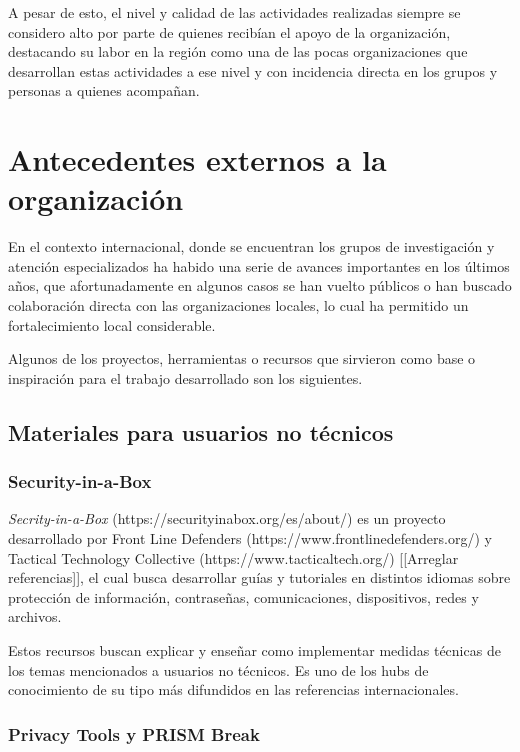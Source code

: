\documentclass[12pt]{caltech_thesis}
\begin{document}
A pesar de esto, el nivel y calidad de las actividades realizadas siempre se considero alto por parte de quienes recibían el apoyo de la organización, destacando su labor en la región como una de las pocas organizaciones que desarrollan estas actividades a ese nivel y con incidencia directa en los grupos y personas a quienes acompañan.

\section{Antecedentes externos a la organización}

En el contexto internacional, donde se encuentran los grupos de investigación y atención especializados ha habido una serie de avances importantes en los últimos años, que afortunadamente en algunos casos se han vuelto públicos o han buscado colaboración directa con las organizaciones locales, lo cual ha permitido un fortalecimiento local considerable.

Algunos de los proyectos, herramientas o recursos que sirvieron como base o inspiración para el trabajo desarrollado son los siguientes.

\subsection{Materiales para usuarios no técnicos}

\subsubsection{Security-in-a-Box}

\textit{Secrity-in-a-Box} (https://securityinabox.org/es/about/) es un proyecto desarrollado por Front Line Defenders (https://www.frontlinedefenders.org/) y Tactical Technology Collective (https://www.tacticaltech.org/) [[Arreglar referencias]], el cual busca desarrollar guías y tutoriales en distintos idiomas sobre protección de información, contraseñas, comunicaciones, dispositivos, redes y archivos.

Estos recursos buscan explicar y enseñar como implementar medidas técnicas de los temas mencionados a usuarios no técnicos. Es uno de los hubs de conocimiento de su tipo más difundidos en las referencias internacionales.

\subsubsection{Privacy Tools y PRISM Break}
\end{document}
